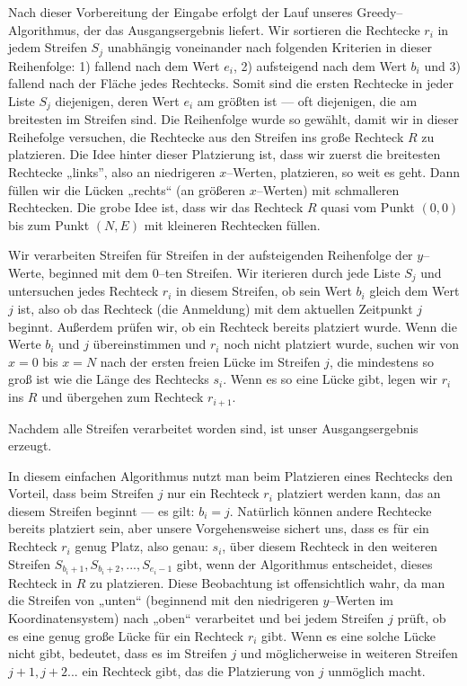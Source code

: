 Nach dieser Vorbereitung der Eingabe erfolgt der Lauf unseres Greedy--Algorithmus, der das
Ausgangsergebnis liefert.
Wir sortieren die Rechtecke $r_i$ in jedem Streifen $S_j$ unabhängig voneinander nach folgenden Kriterien
in dieser Reihenfolge: 
1) fallend nach dem Wert $e_i$,
2) aufsteigend nach dem Wert $b_i$ und
3) fallend nach der Fläche jedes Rechtecks. 
Somit sind die ersten Rechtecke in jeder Liste $S_j$ diejenigen,
deren Wert $e_i$ am größten ist --- oft diejenigen, die am breitesten im Streifen sind.
Die Reihenfolge wurde so gewählt, damit wir in dieser Reihefolge versuchen,
die Rechtecke aus den Streifen ins große Rechteck $R$ zu platzieren.
Die Idee hinter dieser Platzierung ist, dass wir zuerst die breitesten Rechtecke
„links”, also an niedrigeren $x$--Werten, platzieren, so weit es geht. Dann füllen wir 
die Lücken „rechts“ (an größeren $x$--Werten) mit schmalleren Rechtecken. 
Die grobe Idee ist, dass wir das Rechteck $R$ quasi vom Punkt $(0,0)$ bis zum Punkt
$(N, E)$ mit kleineren Rechtecken füllen.



Wir verarbeiten Streifen für Streifen in der
aufsteigenden Reihenfolge der $y$--Werte, beginned mit dem 0--ten Streifen.
Wir iterieren durch jede Liste $S_j$ und untersuchen jedes Rechteck $r_i$ in diesem
Streifen, ob sein Wert $b_i$ gleich dem Wert $j$ ist, also ob das Rechteck (die Anmeldung) mit dem
aktuellen Zeitpunkt $j$ beginnt.
Außerdem prüfen wir, ob ein Rechteck bereits platziert wurde.
Wenn die Werte $b_i$ und $j$ übereinstimmen und $r_i$ noch nicht platziert wurde, 
suchen wir von $x = 0$ bis $x = N$ nach der ersten freien Lücke im Streifen $j$,
die mindestens so groß ist wie die Länge des Rechtecks $s_i$. 
Wenn es so eine Lücke gibt, legen wir $r_i$ ins $R$ und übergehen zum Rechteck $r_{i+1}$.

Nachdem alle Streifen verarbeitet worden sind, ist unser Ausgangsergebnis erzeugt.

In diesem einfachen Algorithmus nutzt man beim Platzieren eines Rechtecks den
Vorteil, dass beim Streifen $j$ nur ein Rechteck $r_i$ platziert werden kann, 
das an diesem Streifen beginnt --- es gilt: $b_i = j$.
Natürlich können andere Rechtecke bereits platziert sein,
aber unsere Vorgehensweise sichert uns, dass es für ein Rechteck $r_i$
genug Platz, also genau: $s_i$, über diesem Rechteck
in den weiteren Streifen $S_{b_i + 1}, S_{b_i + 2}, ..., S_{e_i - 1}$ 
gibt, wenn der Algorithmus entscheidet, dieses Rechteck in $R$ zu platzieren.
Diese Beobachtung ist offensichtlich wahr, da man die Streifen von „unten“ 
(beginnend mit den niedrigeren $y$--Werten im Koordinatensystem) nach „oben“
verarbeitet und bei jedem Streifen $j$ prüft, ob es eine genug große Lücke für ein Rechteck
$r_i$ gibt.
Wenn es eine solche Lücke nicht gibt, bedeutet, dass es im Streifen $j$ und 
möglicherweise in weiteren Streifen $j+1, j+2...$ ein Rechteck gibt, das 
die Platzierung von $j$ unmöglich macht.


